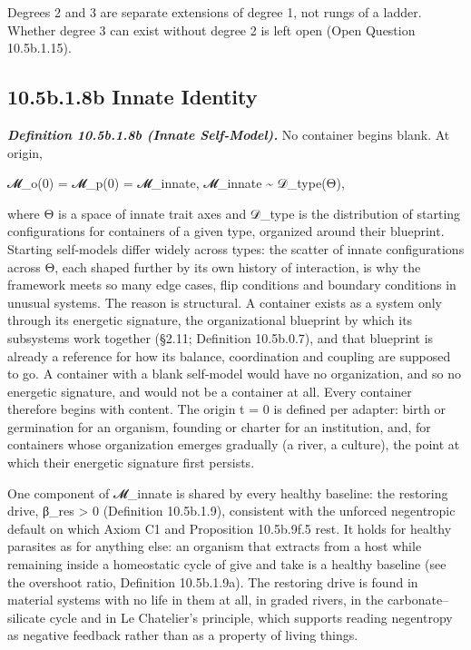 \documentclass[
]{article}
\begin{document}
Degrees 2 and 3 are separate extensions of degree 1, not rungs of a
ladder. Whether degree 3 can exist without degree 2 is left open (Open
Question 10.5b.1.15).

\hypertarget{b.1.8b-innate-identity}{%
\subsection{10.5b.1.8b Innate Identity}\label{b.1.8b-innate-identity}}

\emph{\textbf{Definition 10.5b.1.8b (Innate Self-Model).}} No container
begins blank. At origin,

𝓜\_o(0) = 𝓜\_p(0) = 𝓜\_innate, 𝓜\_innate \textasciitilde{} 𝒟\_type(Θ),

where Θ is a space of innate trait axes and 𝒟\_type is the distribution
of starting configurations for containers of a given type, organized
around their blueprint. Starting self-models differ widely across types:
the scatter of innate configurations across Θ, each shaped further by
its own history of interaction, is why the framework meets so many edge
cases, flip conditions and boundary conditions in unusual systems. The
reason is structural. A container exists as a system only through its
energetic signature, the organizational blueprint by which its
subsystems work together (§2.11; Definition 10.5b.0.7), and that
blueprint is already a reference for how its balance, coordination and
coupling are supposed to go. A container with a blank self-model would
have no organization, and so no energetic signature, and would not be a
container at all. Every container therefore begins with content. The
origin t = 0 is defined per adapter: birth or germination for an
organism, founding or charter for an institution, and, for containers
whose organization emerges gradually (a river, a culture), the point at
which their energetic signature first persists.

One component of 𝓜\_innate is shared by every healthy baseline: the
restoring drive, β\_res \textgreater{} 0 (Definition 10.5b.1.9),
consistent with the unforced negentropic default on which Axiom C1 and
Proposition 10.5b.9f.5 rest. It holds for healthy parasites as for
anything else: an organism that extracts from a host while remaining
inside a homeostatic cycle of give and take is a healthy baseline (see
the overshoot ratio, Definition 10.5b.1.9a). The restoring drive is
found in material systems with no life in them at all, in graded rivers,
in the carbonate--silicate cycle and in Le Chatelier's principle, which
supports reading negentropy as negative feedback rather than as a
property of living things.
\end{document}
